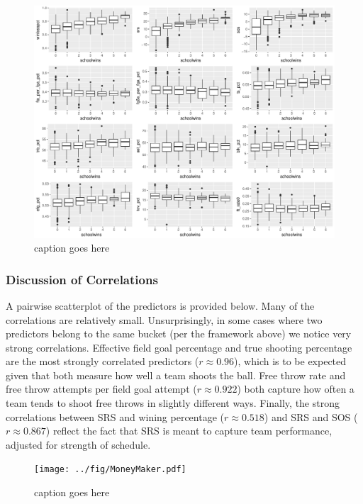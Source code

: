 \documentclass[10pt,a4paper, hidelinks]{article} %
\begin{document}
\begin{figure}[H]
	\centering
	\includegraphics[width=1\linewidth]{../fig/RayleighsWetDream.pdf}
	\caption{caption goes here}
	\label{fig:rayleighwetdream}
\end{figure}

\subsubsection{Discussion of Correlations}

A pairwise scatterplot of the predictors is provided below. Many of the correlations are relatively small. Unsurprisingly, in some cases where two predictors belong to the same bucket (per the framework above) we notice very strong correlations. Effective field goal percentage and true shooting percentage are the most strongly correlated predictors ($r \approx 0.96$), which is to be expected given that both measure how well a team shoots the ball. Free throw rate and free throw attempts per field goal attempt ($r \approx 0.922$) both capture how often a team tends to shoot free throws in slightly different ways. Finally, the strong correlations between SRS and wining percentage ($r \approx 0.518$) and SRS and SOS ($r \approx 0.867$) reflect the fact that SRS is meant to capture team performance, adjusted for strength of schedule.

\begin{figure}[H]
	\centering
	\texttt{[image: ../fig/MoneyMaker.pdf]}
	\caption{caption goes here}
	\label{fig:ggpairs}
\end{figure} 
\end{document}
